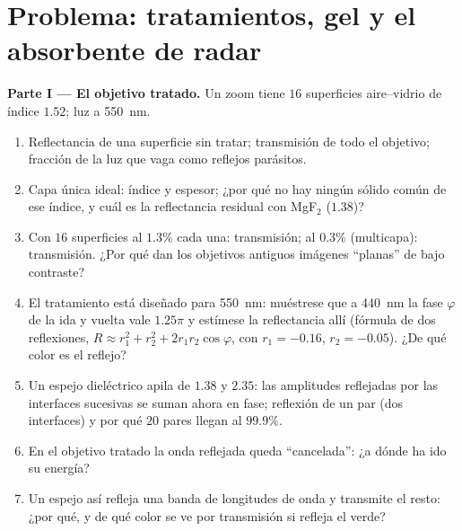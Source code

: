 \section{Problema: tratamientos, gel y el absorbente de radar}

\begin{problem}
\label{pb:b2:wave-interfaces:1}

\medskip
\noindent\textbf{Parte I --- El objetivo tratado.}
Un zoom tiene $16$ superficies aire--vidrio de índice $1.52$; luz a
\qty{550}{nm}.
\begin{enumerate}
  \item Reflectancia de una superficie sin tratar; transmisión de todo el
        objetivo; fracción de la luz que vaga como reflejos parásitos.
  \item Capa única ideal: índice y espesor; ¿por qué no hay ningún
        sólido común de ese índice, y cuál es la reflectancia
        residual con MgF$_2$ ($1.38$)?
  \item Con $16$ superficies al $1.3\%$ cada una: transmisión; al $0.3\%$
        (multicapa): transmisión. ¿Por qué dan los objetivos antiguos imágenes ``planas''
        de bajo contraste?
  \item El tratamiento está diseñado para \qty{550}{nm}: muéstrese que a
        \qty{440}{nm} la fase $\varphi$ de la ida y vuelta vale $1.25\pi$ y
        estímese la reflectancia allí (fórmula de dos reflexiones, $R
        \approx r_1^2 + r_2^2 + 2r_1r_2\cos\varphi$, con $r_1 = -0.16$, $r_2 =
        -0.05$). ¿De qué color es el reflejo?
  \item Un espejo dieléctrico apila  de $1.38$ y
        $2.35$: las amplitudes reflejadas por las interfaces sucesivas
        se suman ahora en fase; reflexión de un par (dos interfaces) y
        por qué $20$ pares llegan al $99.9\%$.
  \item En el objetivo tratado la onda reflejada queda ``cancelada'': ¿a dónde
        ha ido su energía?
  \item Un espejo así refleja una banda de longitudes de onda y transmite
        el resto: ¿por qué, y de qué color se ve por transmisión
        si refleja el verde?
\end{enumerate}


\end{problem}
